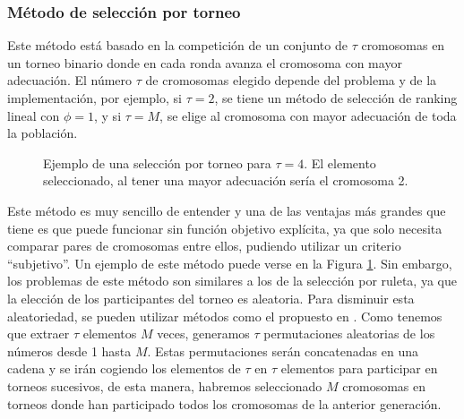 \subsubsection{Método de selección por torneo}
Este método está basado en la competición de un conjunto de $\tau$ cromosomas en un torneo binario donde en cada ronda avanza el cromosoma con mayor adecuación. El número $\tau$ de cromosomas elegido depende del problema y de la implementación, por ejemplo, si $\tau=2$, se tiene un método de selección de ranking lineal con $\phi=1$, y si $\tau=M$, se elige al cromosoma con mayor adecuación de toda la población.

\begin{figure}[t]
    \centering
    \caption{Ejemplo de una selección por torneo para $\tau=4$. El elemento seleccionado, al tener una mayor adecuación sería el cromosoma 2.}
    \label{fig:sel-torneo}
\end{figure}

Este método es muy sencillo de entender y una de las ventajas más grandes que tiene es que puede funcionar sin función objetivo explícita, ya que solo necesita comparar pares de cromosomas entre ellos, pudiendo utilizar un criterio ``subjetivo''. Un ejemplo de este método puede verse en la Figura \ref{fig:sel-torneo}. Sin embargo, los problemas de este método son similares a los de la selección por ruleta, ya que la elección de los participantes del torneo es aleatoria. Para disminuir esta aleatoriedad, se pueden utilizar métodos como el propuesto en \cite{tournament}. Como tenemos que extraer $\tau$ elementos $M$ veces, generamos $\tau$ permutaciones aleatorias de los números desde 1 hasta $M$. Estas permutaciones serán concatenadas en una cadena y se irán cogiendo los elementos de $\tau$ en $\tau$ elementos para participar en torneos sucesivos, de esta manera, habremos seleccionado $M$ cromosomas en torneos donde han participado todos los cromosomas de la anterior generación.

